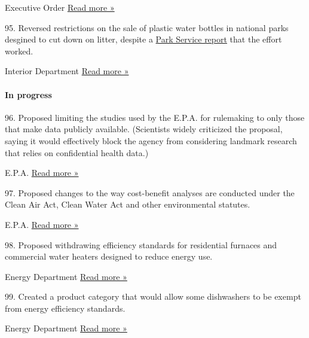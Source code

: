  Executive Order \textbar{}
\href{https://www.nytimes3xbfgragh.onion/interactive/2017/06/02/climate/trump-paris-green-climate-fund.html}{Read
more »}

95. Reversed restrictions on the sale of plastic water bottles in
national parks desgined to cut down on litter, despite a
\href{https://www.nps.gov/aboutus/foia/upload/Disposable-Plastic-Water-Bottle-Evaluation-Report_5_11_17.pdf}{Park
Service report} that the effort worked.

 Interior Department \textbar{}
\href{https://www.npr.org/sections/thesalt/2017/08/18/544456726/trump-administration-reverses-bottled-water-ban-in-national-parks}{Read
more »}

\hypertarget{in-progress-6}{%
\paragraph{In progress}\label{in-progress-6}}

96. Proposed limiting the studies used by the E.P.A. for rulemaking to
only those that make data publicly available. (Scientists widely
criticized the proposal, saying it would effectively block the agency
from considering landmark research that relies on confidential health
data.)

 E.P.A. \textbar{}
\href{https://www.nytimes3xbfgragh.onion/2019/11/11/climate/epa-science-trump.html}{Read
more »}

97. Proposed changes to the way cost-benefit analyses are conducted
under the Clean Air Act, Clean Water Act and other environmental
statutes.

 E.P.A. \textbar{}
\href{https://www.scientificamerican.com/article/planned-changes-to-epa-pollution-analyses-align-with-industry-requests/}{Read
more »}

98. Proposed withdrawing efficiency standards for residential furnaces
and commercial water heaters designed to reduce energy use.

 Energy Department \textbar{}
\href{https://www.federalregister.gov/documents/2018/11/01/2018-23885/energy-conservation-program-energy-conservation-standards-for-residential-furnaces-and-commercial}{Read
more »}

99. Created a product category that would allow some dishwashers to be
exempt from energy efficiency standards.

 Energy Department \textbar{}
\href{https://www.nytimes3xbfgragh.onion/2019/09/17/climate/trump-dishwasher-regulatory-rollback.html}{Read
more »}

